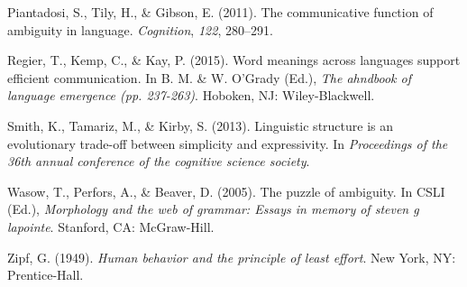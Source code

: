\documentclass[10pt, letterpaper]{article}
\begin{document}
\hypertarget{ref-Piantadosi2011a}{}
Piantadosi, S., Tily, H., \& Gibson, E. (2011). The communicative
function of ambiguity in language. \emph{Cognition}, \emph{122},
280--291.

\hypertarget{ref-RegierKempKay2015a}{}
Regier, T., Kemp, C., \& Kay, P. (2015). Word meanings across languages
support efficient communication. In B. M. \& W. O'Grady (Ed.), \emph{The
ahndbook of language emergence (pp. 237-263)}. Hoboken, NJ:
Wiley-Blackwell.

\hypertarget{ref-SmithTamarizKirby2013a}{}
Smith, K., Tamariz, M., \& Kirby, S. (2013). Linguistic structure is an
evolutionary trade-off between simplicity and expressivity. In
\emph{Proceedings of the 36th annual conference of the cognitive science
society}.

\hypertarget{ref-WasowPerforsBeaver2005a}{}
Wasow, T., Perfors, A., \& Beaver, D. (2005). The puzzle of ambiguity.
In CSLI (Ed.), \emph{Morphology and the web of grammar: Essays in memory
of steven g lapointe}. Stanford, CA: McGraw-Hill.

\hypertarget{ref-Zipf1949a}{}
Zipf, G. (1949). \emph{Human behavior and the principle of least
effort}. New York, NY: Prentice-Hall.


\end{document}

